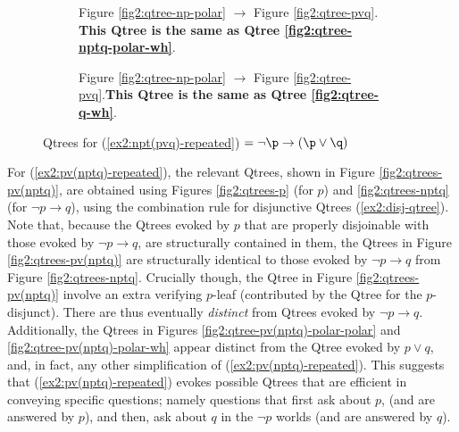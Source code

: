 \begin{figure}[H]
	\centering
	\begin{subfigure}[b]{.45\linewidth}
		\centering
	\caption{Figure \ref{fig2:qtree-np-polar} $\rightarrow$ Figure \ref{fig2:qtree-pvq}. \textbf{This Qtree is the same as Qtree \ref{fig2:qtree-nptq-polar-wh}}.}
	\end{subfigure}\hfill
	\begin{subfigure}[b]{.45\linewidth}
		\centering
		\scalebox{1}{
		\begin{forest}
			[CS [$\p$] [\fbox{$\q$}] [\dbox{$\r$}] [\dbox{...}] ]
		\end{forest}}
	\caption{Figure \ref{fig2:qtree-np-polar} $\rightarrow$ Figure \ref{fig2:qtree-pvq}.\footnotemark \textbf{This Qtree is the same as Qtree \ref{fig2:qtree-q-wh}}.}
	\end{subfigure}
	\caption{Qtrees for (\ref{ex2:npt(pvq)-repeated}) $= \neg \p \rightarrow (\p\vee \q)$}\label{fig2:qtrees-npt(pvq)}
\end{figure}

For (\ref{ex2:pv(nptq)-repeated}), the relevant Qtrees, shown in Figure \ref{fig2:qtrees-pv(nptq)}, are obtained using Figures \ref{fig2:qtrees-p} (for $p$) and \ref{fig2:qtrees-nptq} (for $\neg p \rightarrow q$), using the combination rule for disjunctive Qtrees (\ref{ex2:disj-qtree}). Note that, because the Qtrees evoked by $p$ that are properly disjoinable with those evoked by $\neg p \rightarrow q$, are structurally contained in them, the Qtrees in Figure \ref{fig2:qtrees-pv(nptq)} are structurally identical to those evoked by $\neg p \rightarrow q$ from Figure \ref{fig2:qtrees-nptq}. Crucially though, the Qtree in Figure \ref{fig2:qtrees-pv(nptq)} involve an extra verifying $p$-leaf (contributed by the Qtree for the $p$-disjunct). There are thus eventually \textit{distinct} from Qtrees evoked by $\neg p \rightarrow q$. Additionally, the Qtrees in Figures \ref{fig2:qtree-pv(nptq)-polar-polar} and \ref{fig2:qtree-pv(nptq)-polar-wh} appear distinct from the Qtree evoked by $p \vee q$, and, in fact, any other simplification of (\ref{ex2:pv(nptq)-repeated}). This suggests that (\ref{ex2:pv(nptq)-repeated}) evokes possible Qtrees that are efficient in conveying specific questions; namely questions that first ask about $p$, (and are answered by $p$), and then, ask about $q$ in the $\neg p$ worlds (and are answered by $q$). 

